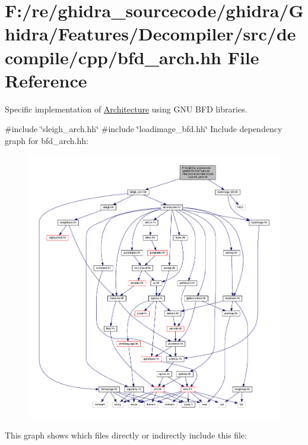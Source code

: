 \hypertarget{bfd__arch_8hh}{}\section{F\+:/re/ghidra\+\_\+sourcecode/ghidra/\+Ghidra/\+Features/\+Decompiler/src/decompile/cpp/bfd\+\_\+arch.hh File Reference}
\label{bfd__arch_8hh}


Specific implementation of \mbox{\hyperlink{class_architecture}{Architecture}} using G\+NU B\+FD libraries.  


{\ttfamily \#include \char`\"{}sleigh\+\_\+arch.\+hh\char`\"{}}\newline
{\ttfamily \#include \char`\"{}loadimage\+\_\+bfd.\+hh\char`\"{}}\newline
Include dependency graph for bfd\+\_\+arch.\+hh\+:
\nopagebreak
\begin{figure}[H]
\begin{center}
\leavevmode
\includegraphics[width=350pt]{bfd__arch_8hh__incl}
\end{center}
\end{figure}
This graph shows which files directly or indirectly include this file\+:
\nopagebreak
